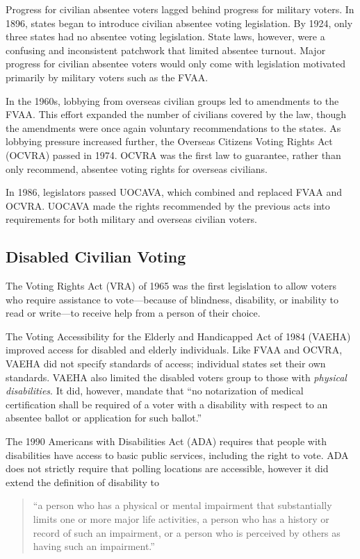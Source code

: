 Progress for civilian absentee voters lagged behind progress for
military voters. In 1896, states began to introduce civilian absentee
voting legislation. By 1924, only three states had no absentee voting
legislation. State laws, however, were a confusing and inconsistent
patchwork that limited absentee turnout. Major progress for civilian
absentee voters would only come with legislation motivated primarily
by military voters such as the FVAA.

In the 1960s, lobbying from overseas civilian groups led to amendments
to the FVAA. This effort expanded the number of civilians covered by
the law, though the amendments were once again voluntary
recommendations to the states. As lobbying pressure increased further,
the Overseas Citizens Voting Rights Act (OCVRA) passed in 1974.  OCVRA
was the first law to guarantee, rather than only recommend, absentee
voting rights for overseas civilians.

In 1986, legislators passed UOCAVA, which combined and replaced FVAA
and OCVRA. UOCAVA made the rights recommended by the previous acts
into requirements for both military and overseas civilian voters.

\subsection{Disabled Civilian Voting}
The Voting Rights Act (VRA) of 1965 was the first legislation to allow
voters who require assistance to vote---because of blindness,
disability, or inability to read or write---to receive help from a
person of their choice.

The Voting Accessibility for the Elderly and Handicapped Act of 1984
(VAEHA) improved access for disabled and elderly individuals.  Like
FVAA and OCVRA, VAEHA did not specify standards of access; individual
states set their own standards. VAEHA also limited the disabled voters
group to those with {\em physical disabilities}. It did, however,
mandate that ``no notarization of medical certification shall be
required of a voter with a disability with respect to an absentee
ballot or application for such ballot.''

The 1990 Americans with Disabilities Act (ADA) requires that people
with disabilities have access to basic public services, including the
right to vote. ADA does not strictly require that polling locations
are accessible, however it did extend the definition of disability to
\begin{quote}
  ``a person who has a physical or mental impairment that
  substantially limits one or more major life activities, a person who
  has a history or record of such an impairment, or a person who is
  perceived by others as having such an impairment.''
\end{quote}

